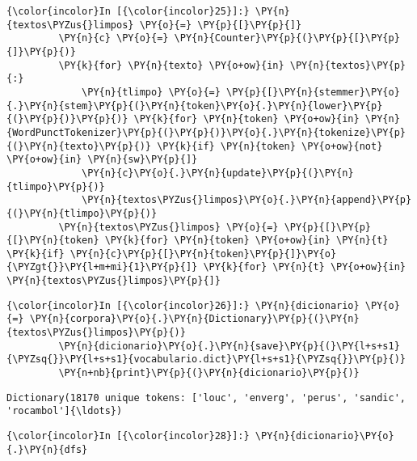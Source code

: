     \begin{Verbatim}[commandchars=\\\{\}]
{\color{incolor}In [{\color{incolor}25}]:} \PY{n}{textos\PYZus{}limpos} \PY{o}{=} \PY{p}{[}\PY{p}{]}
         \PY{n}{c} \PY{o}{=} \PY{n}{Counter}\PY{p}{(}\PY{p}{[}\PY{p}{]}\PY{p}{)}
         \PY{k}{for} \PY{n}{texto} \PY{o+ow}{in} \PY{n}{textos}\PY{p}{:}
             \PY{n}{tlimpo} \PY{o}{=} \PY{p}{[}\PY{n}{stemmer}\PY{o}{.}\PY{n}{stem}\PY{p}{(}\PY{n}{token}\PY{o}{.}\PY{n}{lower}\PY{p}{(}\PY{p}{)}\PY{p}{)} \PY{k}{for} \PY{n}{token} \PY{o+ow}{in} \PY{n}{WordPunctTokenizer}\PY{p}{(}\PY{p}{)}\PY{o}{.}\PY{n}{tokenize}\PY{p}{(}\PY{n}{texto}\PY{p}{)} \PY{k}{if} \PY{n}{token} \PY{o+ow}{not} \PY{o+ow}{in} \PY{n}{sw}\PY{p}{]}
             \PY{n}{c}\PY{o}{.}\PY{n}{update}\PY{p}{(}\PY{n}{tlimpo}\PY{p}{)}
             \PY{n}{textos\PYZus{}limpos}\PY{o}{.}\PY{n}{append}\PY{p}{(}\PY{n}{tlimpo}\PY{p}{)}
         \PY{n}{textos\PYZus{}limpos} \PY{o}{=} \PY{p}{[}\PY{p}{[}\PY{n}{token} \PY{k}{for} \PY{n}{token} \PY{o+ow}{in} \PY{n}{t} \PY{k}{if} \PY{n}{c}\PY{p}{[}\PY{n}{token}\PY{p}{]}\PY{o}{\PYZgt{}}\PY{l+m+mi}{1}\PY{p}{]} \PY{k}{for} \PY{n}{t} \PY{o+ow}{in} \PY{n}{textos\PYZus{}limpos}\PY{p}{]}
\end{Verbatim}

    \begin{Verbatim}[commandchars=\\\{\}]
{\color{incolor}In [{\color{incolor}26}]:} \PY{n}{dicionario} \PY{o}{=} \PY{n}{corpora}\PY{o}{.}\PY{n}{Dictionary}\PY{p}{(}\PY{n}{textos\PYZus{}limpos}\PY{p}{)}
         \PY{n}{dicionario}\PY{o}{.}\PY{n}{save}\PY{p}{(}\PY{l+s+s1}{\PYZsq{}}\PY{l+s+s1}{vocabulario.dict}\PY{l+s+s1}{\PYZsq{}}\PY{p}{)}
         \PY{n+nb}{print}\PY{p}{(}\PY{n}{dicionario}\PY{p}{)}
\end{Verbatim}

    \begin{Verbatim}[commandchars=\\\{\}]
Dictionary(18170 unique tokens: ['louc', 'enverg', 'perus', 'sandic', 'rocambol']{\ldots})

    \end{Verbatim}

    \begin{Verbatim}[commandchars=\\\{\}]
{\color{incolor}In [{\color{incolor}28}]:} \PY{n}{dicionario}\PY{o}{.}\PY{n}{dfs}
\end{Verbatim}

